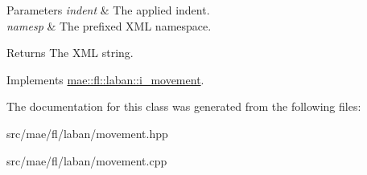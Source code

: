 \begin{DoxyParams}{Parameters}
{\em indent} & The applied indent. \\
\hline
{\em namesp} & The prefixed X\-M\-L namespace.\\
\hline
\end{DoxyParams}
\begin{DoxyReturn}{Returns}
The X\-M\-L string. 
\end{DoxyReturn}


Implements \hyperlink{classmae_1_1fl_1_1laban_1_1i__movement_acd832b2a6976bfe32eae4bece01ee8f3}{mae\-::fl\-::laban\-::i\-\_\-movement}.



The documentation for this class was generated from the following files\-:\begin{DoxyCompactItemize}
\item 
src/mae/fl/laban/movement.\-hpp\item 
src/mae/fl/laban/movement.\-cpp\end{DoxyCompactItemize}
